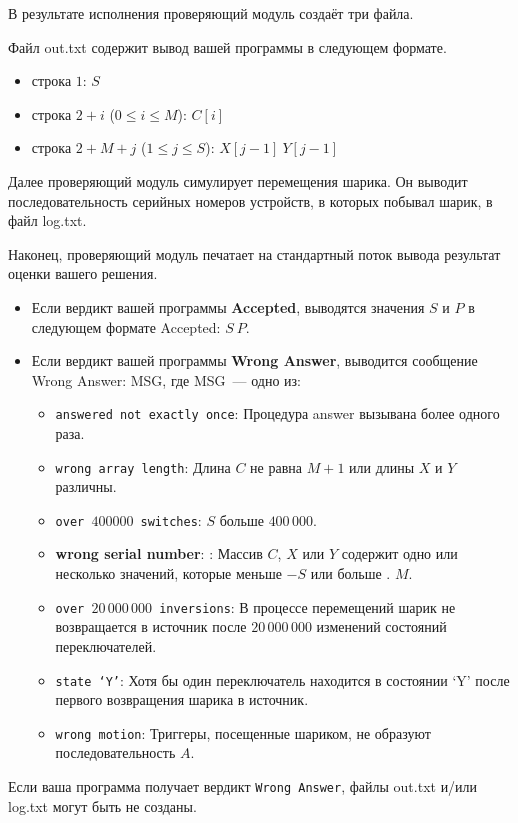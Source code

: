 В результате исполнения проверяющий модуль создаёт три файла.

Файл out.txt содержит вывод вашей программы в следующем формате.
\begin{itemize}
    \item строка $1$: $S$
    \item строка $2 + i$ ($0 \le i \le M$): $C[i]$
    \item строка $2 + M + j$ ($1 \le j \le S$): $X[j-1]\ Y[j-1]$
\end{itemize}

Далее проверяющий модуль симулирует перемещения шарика. Он выводит
последовательность серийных номеров устройств, в которых побывал шарик, в
файл log.txt.

Наконец, проверяющий модуль печатает на стандартный поток вывода результат
оценки вашего решения.

\begin{itemize}
    \item Если вердикт вашей программы \textbf{Accepted}, выводятся значения $S$ и $P$ в
следующем формате Accepted: $S\ P$.
   \item Если вердикт вашей программы \textbf{Wrong Answer}, выводится сообщение Wrong
Answer: MSG, где MSG~--- одно из:
    \begin{itemize}
        \item \texttt{answered not exactly once}: Процедура answer вызывана более одного
раза.
\item \texttt{wrong array length}: Длина $C$ не равна $M + 1$ или длины $X$ и $Y$ различны.
\item \texttt{over $400000$ switches}: $S$ больше $400\,000$.
\item \textbf{wrong serial number}: : Массив $C$, $X$ или $Y$ содержит одно или несколько
значений, которые меньше $-S$ или больше . $M$.
\item \texttt{over $20\,000\,000$ inversions}: В процессе перемещений шарик не
возвращается в источник после $20\,000\,000$ изменений состояний
переключателей.
\item \texttt{state `Y'}: Хотя бы один переключатель находится в состоянии `Y' после
первого возвращения шарика в источник.
\item \texttt{wrong motion}: Триггеры, посещенные шариком, не образуют
последовательность $A$.
    \end{itemize}
\end{itemize}

Если ваша программа получает вердикт \texttt{Wrong Answer}, файлы out.txt и/или
log.txt могут быть не созданы.





